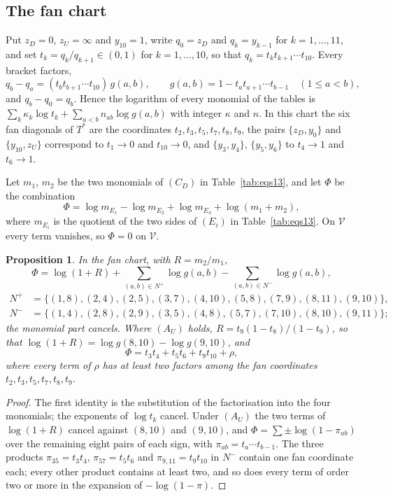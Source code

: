 \documentclass[11pt,a4paper]{article}
\newtheorem{proposition}[theorem]{Proposition}
\theoremstyle{definition}
\theoremstyle{remark}
\newcommand{\V}{\mathcal{V}}
\newcommand{\Tstar}{T^{*}}
\begin{document}
\subsection{The fan chart}
Put $z_D = 0$, $z_U = \infty$ and $y_{10} = 1$, write $q_0 = z_D$ and $q_{k} = y_{k-1}$ for
$k = 1, \dots, 11$, and set $t_k = q_k / q_{k+1} \in (0, 1)$ for $k = 1, \dots, 10$, so that
$q_k = t_k t_{k+1} \cdots t_{10}$. Every bracket factors,
\[
  q_b - q_a = (t_b t_{b+1} \cdots t_{10})\, g(a, b), \qquad g(a, b) = 1 - t_a t_{a+1} \cdots t_{b-1}
  \quad (1 \le a < b),
\]
and $q_b - q_0 = q_b$. Hence the logarithm of every monomial of the tables is
$\sum_k \kappa_k \log t_k + \sum_{a<b} n_{ab} \log g(a,b)$ with integer $\kappa$ and $n$. In this chart
the six fan diagonals of $\Tstar$ are the coordinates $t_2, t_3, t_5, t_7, t_8, t_9$, the pairs
$\{z_D, y_0\}$ and $\{y_{10}, z_U\}$ correspond to $t_1 \to 0$ and $t_{10} \to 0$, and $\{y_3, y_4\}$,
$\{y_5, y_6\}$ to $t_4 \to 1$ and $t_6 \to 1$.

Let $m_1$, $m_2$ be the two monomials of $(C_D)$ in Table~\ref{tab:eqs13}, and let $\Phi$ be the
combination
\[
  \Phi = \log m_{E_1} - \log m_{E_2} + \log m_{E_4} + \log(m_1 + m_2),
\]
where $m_{E_i}$ is the quotient of the two sides of $(E_i)$ in Table~\ref{tab:eqs13}. On $\V$ every term
vanishes, so $\Phi = 0$ on $\V$.

\begin{proposition}\label{prop:phi}
In the fan chart, with $R = m_2/m_1$,
\[
\Phi = \log(1 + R) + \sum_{(a,b) \in N^+} \log g(a,b) - \sum_{(a,b) \in N^-} \log g(a,b),
\]
\begin{align*}
N^+ &= \{(1,8),(2,4),(2,5),(3,7),(4,10),(5,8),(7,9),(8,11),(9,10)\},\\
N^- &= \{(1,4),(2,8),(2,9),(3,5),(4,8),(5,7),(7,10),(8,10),(9,11)\};
\end{align*}
the monomial part cancels. Where $(A_U)$ holds, $R = t_9(1 - t_8)/(1 - t_9)$, so that
$\log(1 + R) = \log g(8,10) - \log g(9,10)$, and
\[
\Phi = t_3 t_4 + t_5 t_6 + t_9 t_{10} + \rho,
\]
where every term of $\rho$ has at least two factors among the fan coordinates
$t_2, t_3, t_5, t_7, t_8, t_9$.
\end{proposition}

\begin{proof}
The first identity is the substitution of the factorisation into the four monomials; the exponents of
$\log t_k$ cancel. Under $(A_U)$ the two terms of $\log(1+R)$ cancel against $(8,10)$ and $(9,10)$, and
$\Phi = \sum \pm \log(1 - \pi_{ab})$ over the remaining eight pairs of each sign, with
$\pi_{ab} = t_a \cdots t_{b-1}$. The three products $\pi_{35} = t_3 t_4$, $\pi_{57} = t_5 t_6$ and
$\pi_{9,11} = t_9 t_{10}$ in $N^-$ contain one fan coordinate each; every other product contains at
least two, and so does every term of order two or more in the expansion of $-\log(1 - \pi)$.
\end{proof}
\end{document}
